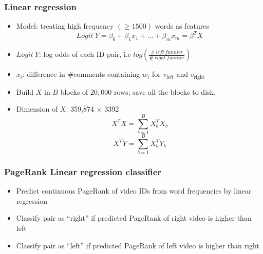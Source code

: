 \documentclass[fleqn]{beamer}
\begin{document}
\begin{frame}
\frametitle{Linear regression}
    \begin{itemize}
     \item Model: treating high frequency $(\geq 1500)$ words as features\\
     $$Logit\ Y = \beta_0 + \beta_1 x_1 + ... + \beta_m x_m = \beta^T X$$
     \item $Logit\ Y$: log odds of each ID pair, i.e $log(\frac{\#\ left\ funnier}{\#\ right\ funnier})$
     \item $x_i$:  difference in \#comments containing $w_i$ for 
              $v_{\mbox{left}}$ and $v_{\mbox{right}}$
     \item Build $X$ in $B$ blocks of $20,000$ rows; save all the blocks to disk.   
     \item Dimension of $X$: 359,874 $\times$ 3392\\
     $$X^TX = \sum_{b=1}^B X_b^TX_b$$
     $$X^TY = \sum_{b=1}^B X_b^TY_b$$
  \end{itemize}
\end{frame}

\begin{frame}
\frametitle{PageRank Linear regression classifier}
    \begin{itemize}
     \item Predict continuous PageRank of video IDs from word frequencies by linear regression
     \item Classify pair as ``right'' if predicted PageRank of right video is higher than left
     \item Classify pair as ``left'' if predicted PageRank of left video is higher than right
   \end{itemize}
\end{frame}
\end{document}

